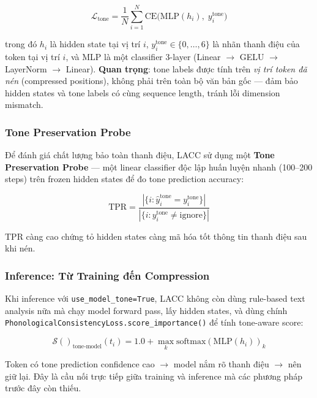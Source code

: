 \documentclass[12pt,a4paper]{article}
\newcommand{\score}[1]{\mathcal{S}(#1)}      %
\newcommand{\method}[1]{\textsc{#1}}         %
\begin{document}
\begin{equation}\label{eq:tone_loss}
    \mathcal{L}_{\text{tone}} = \frac{1}{N} \sum_{i=1}^{N} \text{CE}\big(\text{MLP}(h_i),\; y_i^{\text{tone}}\big)
\end{equation}

trong đó $h_i$ là hidden state tại vị trí $i$, $y_i^{\text{tone}} \in \{0,\dots,6\}$ là nhãn thanh điệu của token tại vị trí $i$, và MLP là một classifier 3-layer (Linear $\to$ GELU $\to$ LayerNorm $\to$ Linear). \textbf{Quan trọng}: tone labels được tính trên \textit{vị trí token đã nén} (compressed positions), không phải trên toàn bộ văn bản gốc --- đảm bảo hidden states và tone labels có cùng sequence length, tránh lỗi dimension mismatch.

\subsubsection{Tone Preservation Probe}

Để đánh giá chất lượng bảo toàn thanh điệu, \method{LACC} sử dụng một \textbf{Tone Preservation Probe} --- một linear classifier độc lập huấn luyện nhanh (100--200 steps) trên frozen hidden states để đo tone prediction accuracy:

\begin{equation}\label{eq:tpr}
    \text{TPR} = \frac{|\{i : \hat{y}_i^{\text{tone}} = y_i^{\text{tone}}\}|}{|\{i : y_i^{\text{tone}} \neq \text{ignore}\}|}
\end{equation}

TPR càng cao chứng tỏ hidden states càng mã hóa tốt thông tin thanh điệu sau khi nén.

\subsubsection{Inference: Từ Training đến Compression}

Khi inference với \texttt{use\_model\_tone=True}, \method{LACC} không còn dùng rule-based text analysis nữa mà chạy model forward pass, lấy hidden states, và dùng chính \texttt{PhonologicalConsistencyLoss.score\_importance()} để tính tone-aware score:

\begin{equation}\label{eq:model_score}
    \score{}_{\text{tone-model}}(t_i) = 1.0 + \max_k \text{softmax}(\text{MLP}(h_i))_k
\end{equation}

Token có tone prediction confidence cao $\to$ model nắm rõ thanh điệu $\to$ nên giữ lại. Đây là cầu nối trực tiếp giữa training và inference mà các phương pháp trước đây còn thiếu.
\end{document}
